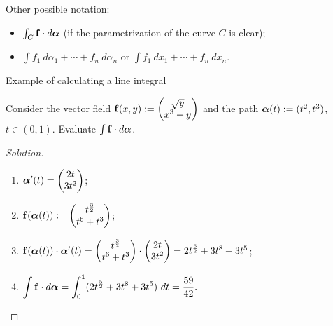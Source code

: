 {Other possible notation:}
\begin{itemize}
    \item  \(\int_C \mathbf{f} \cdot d\boldsymbol{\alpha}  \) (if the parametrization of the curve \(C\) is clear);
    \item \(\int f_1 \ d\alpha_1 + \cdots + f_n \ d\alpha_n\) or \(\int f_1 \ dx_1 + \cdots + f_n \ dx_n\).
\end{itemize}





{Example of calculating a line integral}


\begin{example}
    Consider the vector field \(\mathbf{f}(x,y) := \begin{pmatrix}
        \sqrt y \\ x^3 + y
    \end{pmatrix}\)
    and the path
    \(\boldsymbol{\alpha}(t):= (t^2,t^3)\), \(t \in (0,1)\).
    Evaluate \(\int \mathbf{f} \cdot d\boldsymbol{\alpha}\).
\end{example}
\begin{proof}[Solution]
    \begin{enumerate}
        \item \(\boldsymbol{\alpha}'(t) = \begin{pmatrix}
                  2t \\ 3t^2
              \end{pmatrix}\);
        \item \(\mathbf{f}(\boldsymbol{\alpha}(t)) := \begin{pmatrix}
                  t^{\frac{3}{2}} \\ t^6 + t^3
              \end{pmatrix}\);
        \item \( \mathbf{f}(\boldsymbol{\alpha}(t)) \cdot  \boldsymbol{\alpha}'(t) = \begin{pmatrix}
                  t^{\frac{3}{2}} \\ t^6 + t^3
              \end{pmatrix} \cdot  \begin{pmatrix}
                  2t \\ 3t^2
              \end{pmatrix} = 2 t^{\frac{5}{2}} + 3t^8 + 3t^5\);
        \item
              \(
              \displaystyle\int \mathbf{f} \cdot d\boldsymbol{\alpha} = \displaystyle\int_{0}^{1} (2 t^{\frac{5}{2}} + 3t^8 + 3t^5 ) \ dt = \frac{59}{42}.
              \) \qedhere
    \end{enumerate}
\end{proof}


